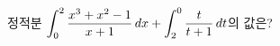 정적분 $\displaystyle\int_{0}^{2}\dfrac{x^3+x^2-1}{x+1}\mkern3mu dx+\int_{2}^{0}\dfrac{t}{t+1}\mkern3mu dt$의 값은?
